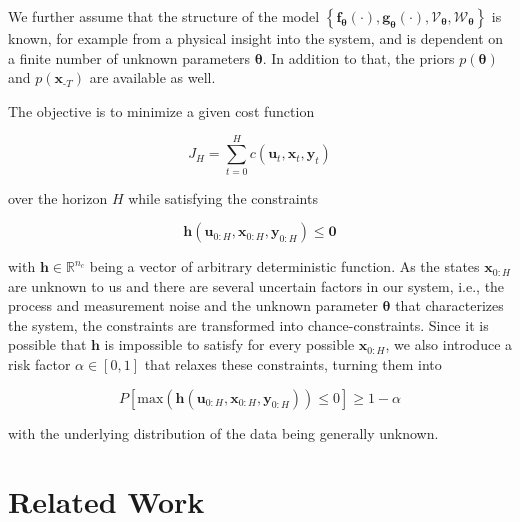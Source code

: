 We further assume that the structure of the model $\left\{\boldsymbol{f}_{\boldsymbol{\theta}}(\cdot), \boldsymbol{g}_{\boldsymbol{\theta}}(\cdot), \boldsymbol{\mathcal{V}}_{\boldsymbol{\theta}}, \boldsymbol{\mathcal{W}}_{\boldsymbol{\theta}}\right\}$ is known, for example from a physical insight into the system, and is dependent on a finite number of unknown parameters $\boldsymbol{\theta}$. In addition to that, the priors $p(\boldsymbol{\theta})$ and $p(\boldsymbol{x}_{\text{-}T})$ are available as well.

The objective is to minimize a given cost function 

\begin{equation} \label{cost function}
J_H = \sum_{t = 0}^H c(\boldsymbol{u}_t,  \boldsymbol{x}_t,  \boldsymbol{y}_t)
\end{equation}

over the horizon $H$ while satisfying the constraints 

\begin{equation} \label{constraints}
\boldsymbol{h}(\boldsymbol{u}_{0:H},  \boldsymbol{x}_{0:H},  \boldsymbol{y}_{0:H}) \leq \boldsymbol{0}
\end{equation}

with $\boldsymbol{h} \in \mathbb{R}^{n_c}$ being a vector of arbitrary deterministic function. As the states $\boldsymbol{x}_{0:H}$ are unknown to us and there are several uncertain factors in our system, i.e., the process and measurement noise and the unknown parameter $\boldsymbol{\theta}$ that characterizes the system, the constraints are transformed into chance-constraints. Since it is possible that $\boldsymbol{h}$ is impossible to satisfy for every possible $\boldsymbol{x}_{0:H}$, we also introduce a risk factor $\alpha \in [0, 1]$ that relaxes these constraints, turning them into

\begin{equation} \label{risk constraints}
P \left[ \text{max} (\boldsymbol{h}(\boldsymbol{u}_{0:H},  \boldsymbol{x}_{0:H},  \boldsymbol{y}_{0:H})) \leq 0 \right] \geq 1 - \alpha
\end{equation}

with the underlying distribution of the data being generally unknown.

\section{Related Work} \label{Related Work}


